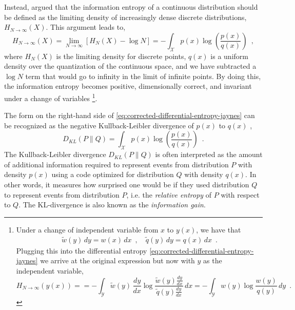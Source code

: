 Instead, \textcite{jaynes_information_1957,jaynes_prior_1968} argued that the information entropy of a continuous distribution should be defined as the limiting density of increasingly dense discrete distributions, $H_{N\rightarrow\infty}(X)$. This argument leads to,
%
\begin{equation} \label{eq:corrected-differential-entropy-jaynes}
    H_{N\rightarrow\infty}(X) = \lim_{N\rightarrow\infty} [H_{N}(X) - \log N] = - \int_\mathcal{X} p(x) \log \left(\frac{p(x)}{q(x)}\right) \enspace ,
\end{equation}
%
where $H_N(X)$ is the limiting density for discrete points, $q(x)$ is a uniform density over the quantization of the continuous space, and we have subtracted a $\log N$ term that would go to infinity in the limit of infinite points.
By doing this, the information entropy becomes positive, dimensionally correct, and invariant under a change of variables%
\footnote{\label{fn:change-of-variables-invariance-of-corrected-differential-entropy}
    Under a change of independent variable from $x$ to $y(x)$, we have that
    \begin{align*}
        \widetilde{w}(y)\,dy = w(x)\,dx \enspace , \quad
        \widetilde{q}(y)\,dy = q(x)\,dx \enspace .
    \end{align*}
    Plugging this into the differential entropy \cref{eq:corrected-differential-entropy-jaynes} we arrive at the original expression but now with $y$ as the independent variable,
    \begin{equation*}
        H_{N\rightarrow\infty}(y(x)) =  = - \int_\mathcal{Y} \widetilde{w}(y)\,\frac{dy}{dx} \log \frac{\widetilde{w}(y)\frac{dy}{dx}}{\widetilde{q}(y)\frac{dy}{dx}} \, dx = - \int_\mathcal{Y} w(y) \log \frac{w(y)}{q(y)} \, dy \enspace .
    \end{equation*}
}.

The form on the right-hand side of \cref{eq:corrected-differential-entropy-jaynes} can be recognized as the negative Kullback-Leibler divergence of $p(x)$ to $q(x)$ \cite{kullback_information_1959},
%
\begin{equation} \label{eq:kullback-leibler-divergence}
    D_{KL}(P\parallel Q) = \int_\mathcal{X} p(x) \log \left(\frac{p(x)}{q(x)}\right) \enspace .
\end{equation}
%
The Kullback-Leibler divergence $D_{KL}(P\parallel Q)$ is often interpreted as the amount of additional information required to represent events from distribution $P$ with density $p(x)$ using a code optimized for distribution $Q$ with density $q(x)$. In other words, it measures how surprised one would be if they used distribution $Q$ to represent events from distribution $P$, i.e. the \emph{relative entropy} of $P$ with respect to $Q$. 
The KL-divergence is also known as the \emph{information gain}. 

